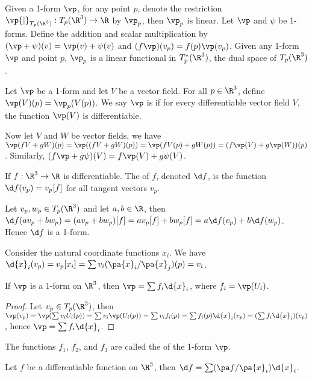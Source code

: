 \documentclass[10pt]{article}
\begin{document}
\par
Given a 1-form $\vp$, for any point $p$, denote the restriction $\vp{\vert}_{{T}_{p}({\R}^{3})}:{T}_{p}({\R}^{3})\to\R$ by ${\vp}_{p}$, then ${\vp}_{p}$ is linear. Let $\vp$ and $\psi$ be 1-forms. Define the addition and scalar multiplication by $(\vp+\psi)(v)=\vp(v)+\psi(v)$ and $(f\vp)({v}_{p})=f(p)\vp({v}_{p})$. Given any 1-form $\vp$ and point $p$, ${\vp}_{p}$ is a linear functional in ${T}_{p}^{*}({\R}^{3})$, the dual space of ${T}_{p}({\R}^{3})$.
\begin{definition}
    Let $\vp$ be a 1-form and let $V$ be a vector field. For all $p\in{\R}^{3}$, define $\vp(V)(p)={\vp}_{p}(V(p))$. We say $\vp$ is  if for every differentiable vector field $V$, the function $\vp(V)$ is differentiable.
\end{definition}
\par
Now let $V$ and $W$ be vector fields, we have $\vp(fV+gW)(p)=\vp((fV+gW)(p))=\vp(fV(p)+gW(p))=(f\vp(V)+g\vp(W))(p)$. Similarly, $(f\vp+g\psi)(V)=f\vp(V)+g\psi(V)$.
\begin{definition}
    If $f:{\R}^{3}\to\R$ is differentiable. The  of $f$, denoted $\d f$, is the function $\d f({v}_{p})={v}_{p}[f]$ for all tangent vectors ${v}_{p}$.
\end{definition}
\par
Let ${v}_{p},{w}_{p}\in{T}_{p}({\R}^{3})$ and let $a,b\in\R$, then $\d f(a{v}_{p}+b{w}_{p})=(a{v}_{p}+b{w}_{p})[f]=a{v}_{p}[f]+b{w}_{p}[f]=a\d f({v}_{p})+b\d f({w}_{p})$. Hence $\d f$ is a 1-form.
\begin{example}
    Consider the natural coordinate functions ${x}_{i}$. We have $\d{x}_{i}({v}_{p})={v}_{p}[{x}_{i}]=\sum{v}_{i}(\pa{x}_{i}/\pa{x}_{j})(p)={v}_{i}$.
\end{example}
\begin{proposition}
    If $\vp$ is a 1-form on ${\R}^{3}$, then $\vp=\sum{f}_{i}\d{x}_{i}$, where ${f}_{i}=\vp({U}_{i})$.
\end{proposition}
\begin{proof}
    Let ${v}_{p}\in{T}_{p}({\R}^{3})$, then $\vp({v}_{p})=\vp(\sum{v}_{i}{U}_{i}(p))=\sum{v}_{i}\vp({U}_{i}(p))=\sum{v}_{i}{f}_{i}(p)=\sum{f}_{i}(p)\d{x}_{i}({v}_{p})=(\sum{f}_{i}\d{x}_{i})({v}_{p})$, hence $\vp=\sum{f}_{i}\d{x}_{i}$.
\end{proof}
\par
The functions ${f}_{1}$, ${f}_{2}$, and ${f}_{3}$ are called the  of the 1-form $\vp$.
\begin{proposition}
    Let $f$ be a differentiable function on ${\R}^{3}$, then $\d f=\sum(\pa f/\pa{x}_{i})\d{x}_{i}$.
\end{proposition}
\end{document}
